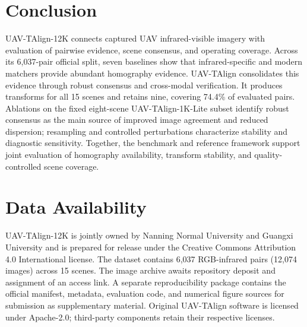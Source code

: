 
\section{Conclusion}

UAV-TAlign-12K connects captured UAV infrared-visible imagery with evaluation of pairwise evidence,
scene consensus, and operating coverage. Across its 6,037-pair official split, seven baselines
show that infrared-specific and modern matchers provide abundant homography evidence.
UAV-TAlign consolidates this evidence through robust consensus and cross-modal verification.
It produces transforms for all 15 scenes and retains nine, covering 74.4\% of evaluated
pairs. Ablations on the fixed eight-scene UAV-TAlign-1K-Lite subset identify robust consensus as the main source of improved image
agreement and reduced dispersion; resampling and controlled perturbations characterize stability
and diagnostic sensitivity. Together, the benchmark and reference framework support joint evaluation
of homography availability, transform stability, and quality-controlled scene coverage.

\section*{Data Availability}

UAV-TAlign-12K is jointly owned by Nanning Normal University and Guangxi University and is
prepared for release under the Creative Commons Attribution 4.0 International license.
The dataset contains 6,037 RGB-infrared pairs (12,074 images) across 15 scenes.
The image archive awaits repository deposit and assignment of an access
link. A separate reproducibility package contains the official manifest, metadata,
evaluation code, and numerical figure sources for submission as supplementary
material. Original UAV-TAlign software is licensed under Apache-2.0; third-party components
retain their respective licenses.
